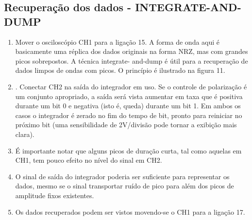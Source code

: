         \subsection{Recuperação dos dados - INTEGRATE-AND-DUMP}
            \begin{enumerate}
                \item Mover o osciloscópio CH1 para a ligação 15. A forma de onda aqui é basicamente uma réplica
                dos dados originais na forma NRZ, mas com grandes picos sobrepostos. A técnica integrate-
                and-dump é útil para a recuperação de dados limpos de ondas com picos. O princípio é
                ilustrado na figura 11.
                \item. Conectar CH2 na saída do integrador em uso. Se o controle de polarização é um conjunto
                apropriado, a saída será vista aumentar em taxa que é positiva durante um bit 0 e negativa
                (isto é, queda) durante um bit 1. Em ambos os casos o integrador é zerado no fim do tempo
                de bit, pronto para reiniciar no próximo bit (uma sensibilidade de 2V/divisão pode tornar a
                exibição mais clara).
                \item É importante notar que alguns picos de duração curta, tal como aquelas em CH1, tem pouco
                efeito no nível do sinal em CH2.
                \item O sinal de saída do integrador poderia ser suficiente para representar os dados, mesmo se o
                sinal transportar ruído de pico para além dos picos de amplitude fixos existentes.
                \item Os dados recuperados podem ser vistos movendo-se o CH1 para a ligação 17.
            \end{enumerate}
            
            
         